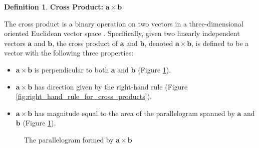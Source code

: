 \documentclass{article}
\theoremstyle{definition}
\newtheorem{definition}{Definition}[section]
\begin{document}
\bigskip
\begin{definition}
{\bf Cross Product:} $\mathbf{a} \times \mathbf{b}$

\bigskip
\noindent
The cross product is a binary operation on two vectors in a
three-dimensional oriented Euclidean vector space
\cite{euclidian_space}.  Specifically, given two linearly
independent vectors $\mathbf{a}$ and $\mathbf{b}$, the cross
product of $\mathbf{a}$ and $\mathbf{b}$, denoted $\mathbf{a}
\times \mathbf{b}$, is defined to be a vector with the following
three properties:

\bigskip
\begin{itemize}
\item $\mathbf{a} \times \mathbf{b}$ is perpendicular to both
$\mathbf{a}$ and $\mathbf{b}$ (Figure \ref{fig:cross_product_parallelogram}).


\item $\mathbf{a} \times \mathbf{b}$ has direction given by the
right-hand rule (Figure \ref{fig:right_hand_rule_for_cross_products}).

 
\item $\mathbf{a} \times \mathbf{b}$ has magnitude equal to
the area of the parallelogram spanned by $\mathbf{a}$ and
$\mathbf{b}$ (Figure \ref{fig:cross_product_parallelogram}).
\end{itemize}

\bigskip
\begin{figure}[H]
\caption{The parallelogram formed by $\mathbf{a} \times
\mathbf{b}$ \cite{wiki:cross_product}}
\label{fig:cross_product_parallelogram}
\end{figure}



\end{definition}
\end{document}
